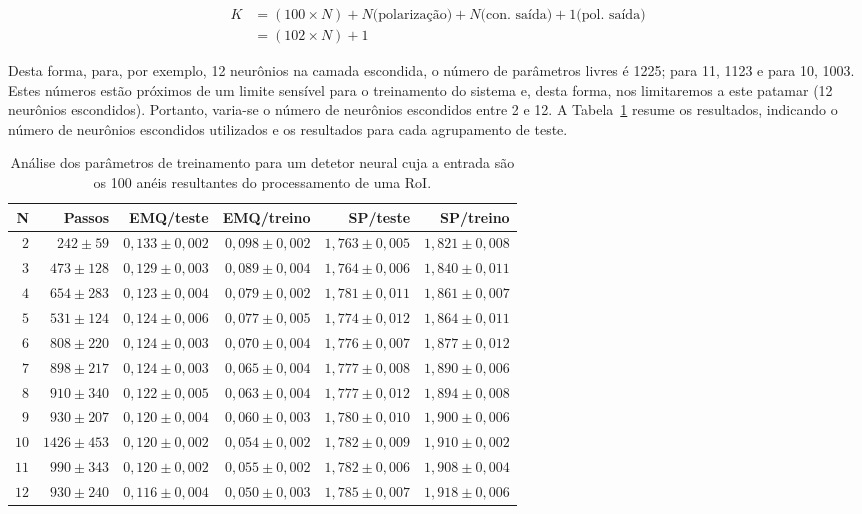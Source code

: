 \begin{align}
K &= (100 \times N) + N \text{(polarização)} + N 
\text{(con. saída)} + 1 \text{(pol. saída)} \\
&= (102 \times N) + 1
\end{align}

Desta forma, para, por exemplo, 12 neurônios na camada escondida, o número de
parâmetros livres é 1225; para 11, 1123 e para 10, 1003. Estes números estão
próximos de um limite sensível para o treinamento do sistema e, desta forma,
nos limitaremos a este patamar (12 neurônios escondidos). Portanto, varia-se o
número de neurônios escondidos entre 2 e 12. A
Tabela~\ref{tab:ringer-param-optimization} resume os resultados, indicando o
número de neurônios escondidos utilizados e os resultados para cada agrupamento
de teste.

\begin{table}
\caption{Análise dos parâmetros de treinamento para um detetor neural cuja a
entrada são os 100 anéis resultantes do processamento de uma RoI.}
\label{tab:ringer-param-optimization}
\begin{center}
\begin{tabular}{|r|r|r|r|r|r|} \hline
N & Passos & EMQ/teste & EMQ/treino & SP/teste & SP/treino \\ \hline 
$2$ & $242\pm59$ & $0,133\pm0,002$ & $0,098\pm0,002$ & $1,763\pm0,005$ &
$1,821\pm0,008$ \\ 
$3$ & $473\pm128$ & $0,129\pm0,003$ & $0,089\pm0,004$ & $1,764\pm0,006$ & $1,840
\pm0,011$ \\
$4$ & $654\pm283$ & $0,123\pm0,004$ & $0,079\pm0,002$ & $1,781\pm0,011$ & $1,861
\pm0,007$ \\
$5$ & $531\pm124$ & $0,124\pm0,006$ & $0,077\pm0,005$ & $1,774\pm0,012$ & $1,864
\pm0,011$ \\
$6$ & $808\pm220$ & $0,124\pm0,003$ & $0,070\pm0,004$ & $1,776\pm0,007$ & $1,877
\pm0,012$ \\
$7$ & $898\pm217$ & $0,124\pm0,003$ & $0,065\pm0,004$ & $1,777\pm0,008$ & $1,890
\pm0,006$ \\
$8$ & $910\pm340$ & $0,122\pm0,005$ & $0,063\pm0,004$ & $1,777\pm0,012$ & $1,894
\pm0,008$ \\
$9$ & $930\pm207$ & $0,120\pm0,004$ & $0,060\pm0,003$ & $1,780\pm0,010$ & $1,900
\pm0,006$ \\
$10$ & $1426\pm453$ & $0,120\pm0,002$ & $0,054\pm0,002$ & $1,782\pm0,009$ & $1,9
10\pm0,002$ \\
$11$ & $990\pm343$ & $0,120\pm0,002$ & $0,055\pm0,002$ & $1,782\pm0,006$ & $1,90
8\pm0,004$ \\
$12$ & $930\pm240$ & $0,116\pm0,004$ & $0,050\pm0,003$ & $1,785\pm0,007$ & $1,91
8\pm0,006$ \\
\hline
\end{tabular}
\end{center}
\end{table}

